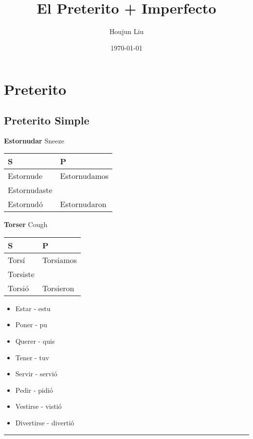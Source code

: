 \documentclass[letterpaper]{article}
\author{Houjun Liu}
\date{\today}
\title{El Preterito + Imperfecto}
\renewcommand{\tableofcontents}{}
\begin{document}
\tableofcontents



\section{Preterito}
\label{sec:org36c3ff9}
\subsection{Preterito Simple}
\label{sec:org43a0a4c}
\textbf{Estornudar} Sneeze

\begin{center}
\begin{tabular}{ll}
S & P\\
\hline
Estornude & Estornudamos\\
Estornudaste & \\
Estornudó & Estornudaron\\
\end{tabular}
\end{center}

\textbf{Torser} Cough

\begin{center}
\begin{tabular}{ll}
S & P\\
\hline
Torsí & Torsiamos\\
Torsiste & \\
Torsió & Torsieron\\
\end{tabular}
\end{center}

\begin{itemize}
\item Estar - estu

\item Poner - pu

\item Querer - quis

\item Tener - tuv

\item Servir - servió

\item Pedir - pidió

\item Vestirse - vistió

\item Divertirse - divertió
\end{itemize}

\noindent\rule{\textwidth}{0.5pt}
\end{document}
